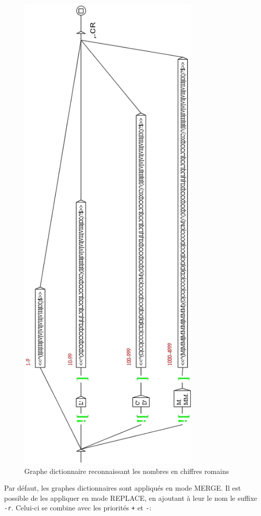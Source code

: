 \bigskip
\begin{figure}[!p]
\begin{center}
\includegraphics[height=24cm]{resources/img/fig3-14.png}
\caption{Graphe dictionnaire reconnaissant les nombres en chiffres romains\label{graph-CR}}
\end{center}
\end{figure}

\bigskip
\noindent Par défaut, les graphes dictionnaires sont appliqués en mode MERGE. Il est possible 
de les appliquer en mode REPLACE, en ajoutant à leur le nom le suffixe \verb+-r+. Celui-ci se
combine avec les priorités \verb-+- et \verb+-+:

